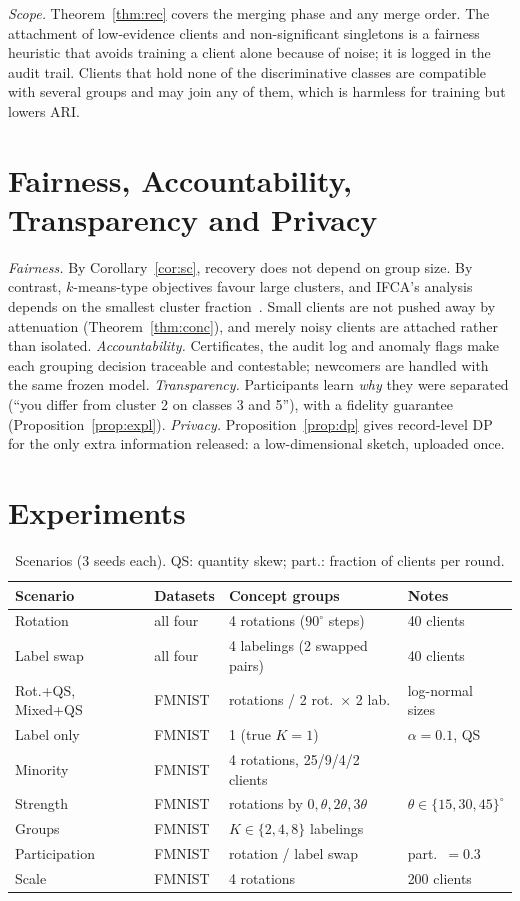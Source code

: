 \documentclass[journal]{IEEEtran}
\theoremstyle{definition}
\begin{document}
\emph{Scope.} Theorem~\ref{thm:rec} covers the merging phase and any merge order. The attachment of low-evidence clients and non-significant singletons is a fairness heuristic that avoids training a client alone because of noise; it is logged in the audit trail. Clients that hold none of the discriminative classes are compatible with several groups and may join any of them, which is harmless for training but lowers ARI.

\section{Fairness, Accountability, Transparency and Privacy}\label{sec:fat}
\emph{Fairness.} By Corollary~\ref{cor:sc}, recovery does not depend on group size. By contrast, $k$-means-type objectives favour large clusters, and IFCA's analysis depends on the smallest cluster fraction~\cite{ghosh2020ifca}. Small clients are not pushed away by attenuation (Theorem~\ref{thm:conc}), and merely noisy clients are attached rather than isolated. \emph{Accountability.} Certificates, the audit log and anomaly flags make each grouping decision traceable and contestable; newcomers are handled with the same frozen model. \emph{Transparency.} Participants learn \emph{why} they were separated (``you differ from cluster 2 on classes 3 and 5''), with a fidelity guarantee (Proposition~\ref{prop:expl}). \emph{Privacy.} Proposition~\ref{prop:dp} gives record-level DP for the only extra information released: a low-dimensional sketch, uploaded once.

\section{Experiments}\label{sec:exp}
\begin{table}[t]
\centering
\caption{Scenarios (3 seeds each). QS: quantity skew; part.: fraction of clients per round.}\label{tab:scen}
\scriptsize\setlength{\tabcolsep}{2.5pt}
\begin{tabular}{llll}
\toprule
Scenario & Datasets & Concept groups & Notes \\
\midrule
Rotation & all four & 4 rotations ($90^\circ$ steps) & 40 clients \\
Label swap & all four & 4 labelings (2 swapped pairs) & 40 clients \\
Rot.+QS, Mixed+QS & FMNIST & rotations / 2 rot.\ $\times$ 2 lab. & log-normal sizes \\
Label only & FMNIST & 1 (true $K=1$) & $\alpha=0.1$, QS \\
Minority & FMNIST & 4 rotations, 25/9/4/2 clients & \\
Strength & FMNIST & rotations by $0,\theta,2\theta,3\theta$ & $\theta\in\{15,30,45\}^\circ$ \\
Groups & FMNIST & $K\in\{2,4,8\}$ labelings & \\
Participation & FMNIST & rotation / label swap & part.\ $=0.3$ \\
Scale & FMNIST & 4 rotations & 200 clients \\
\bottomrule
\end{tabular}
\end{table}
\end{document}
